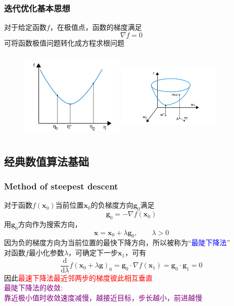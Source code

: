 \frame
{
	\frametitle{迭代优化基本思想}
	对于给定函数$f$，在极值点，函数的梯度满足
	\begin{displaymath}
		\nabla f=0
	\end{displaymath}
	可将函数极值问题转化成方程求根问题
\begin{figure}[h!]
\centering
\includegraphics[height=1.68in,width=1.95in,viewport=30 0 450 360,clip]{Figures/OP_mini-1.png}
\hskip 0.05in
\includegraphics[height=1.68in,width=1.95in,viewport=150 20 560 390,clip]{Figures/OP_mini-2.png}
\label{OP_mini}
\end{figure}
}

\subsection{经典数值算法基础}
\frame
{
	\frametitle{\textrm{Method of steepest descent}}
	对于函数$f(\mathbf{x}_0)$当前位置$\mathbf{x}_0$的负梯度方向$\mathbf{g}_0$满足
	\begin{displaymath}
		\mathbf{g}_0=-\nabla f(\mathbf{x}_0)
	\end{displaymath}
	用$\mathbf{g}_0$方向作为搜索方向，
	\begin{displaymath}
		\mathbf{x}=\mathbf{x}_0+\lambda\mathbf{g}_0,\qquad \lambda>0
	\end{displaymath}
	因为负的梯度方向为当前位置的最快下降方向，所以被称为“\textcolor{blue}{最陡下降法}”\\
	对函数$f$最小化参数$\lambda$，可确定下一步$\mathbf{x}_1$，可有
	\begin{displaymath}
		\dfrac{\mathrm{d}}{\mathrm{d}\lambda}f(\mathbf{x}_0+\lambda\mathbf{g})_0=\mathbf{g}_0\cdot\nabla f(\mathbf{x}_1)=\mathbf{g}_0\cdot\mathbf{g}_1=0
	\end{displaymath}
	因此\textcolor{red}{最速下降法最近邻两步的梯度彼此相互垂直}\\
	\textcolor{purple}{最陡下降法的收敛:~\\靠近极小值时收敛速度减慢，越接近目标，步长越小，前进越慢}
}

